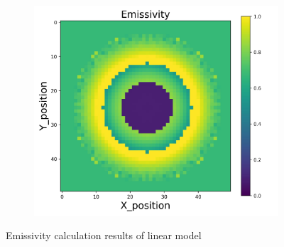 \begin{figure}[p]
\begin{minipage}{\textwidth}
\begin{subfigure}{0.325\textwidth}
        \end{subfigure}
        \begin{subfigure}{0.325\textwidth}
            \centering
            \includegraphics[width=\textwidth]{figures/raw_data/33/linear/emi_cal.jpg}
        \end{subfigure}
    \end{minipage}
    \caption{Emissivity calculation results of linear model}  
\end{figure}


\newpage
